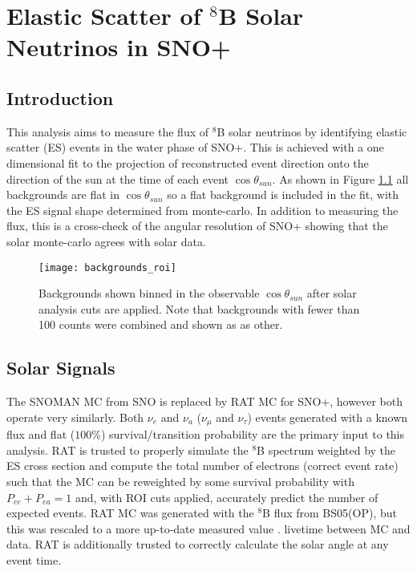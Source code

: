 \chapter{Elastic Scatter of $^8$B Solar Neutrinos in SNO+}
\label{ch:es}

\section{Introduction}
\label{sec:solar:intro}

This analysis aims to measure the flux of $^8$B solar neutrinos by identifying
elastic scatter (ES) events in the water phase of SNO+.
This is achieved with a one dimensional fit to the projection of reconstructed
event direction onto the direction of the sun at the time of each event
$\cos{\theta_{sun}}$.
As shown in Figure \ref{fig:solar:backgrounds} all backgrounds are flat in
$\cos{\theta_{sun}}$ so a flat background is included in the fit, with the ES
signal shape determined from monte-carlo.
In addition to measuring the flux, this is a cross-check of the angular
resolution of SNO+ showing that the solar monte-carlo agrees with solar data.

\begin{figure}
\centering
\texttt{[image: backgrounds\_roi]}
\caption{Backgrounds shown binned in the observable $\cos{\theta_{sun}}$ after
         solar analysis cuts are applied. Note that backgrounds with fewer than
         100 counts were combined and shown as as other.}
\label{fig:solar:backgrounds}
\end{figure}

\section{Solar Signals}
\label{sec:solar:inputs}

The SNOMAN MC from SNO is replaced by RAT MC for SNO+, however both operate very similarly.
Both $\nu_e$ and $\nu_a$ ($\nu_\mu$ and $\nu_\tau$) events generated with a known
flux and flat ($100\%$) survival/transition probability are the primary input to this
analysis.
RAT is trusted to properly simulate the $^8$B spectrum weighted by the ES cross
section and compute the total number of electrons (correct event rate) such
that the MC can be reweighted by some survival probability with
$P_{ee}+P_{ea}=1$ and, with ROI cuts applied, accurately predict the number of
expected events.
RAT MC was generated with the $^8$B flux from BS05(OP), but this was rescaled 
to a more up-to-date measured value \cite{GlobalSolarFlux}.
livetime between MC and data.
RAT is additionally trusted to correctly calculate the solar angle at any
event time.

